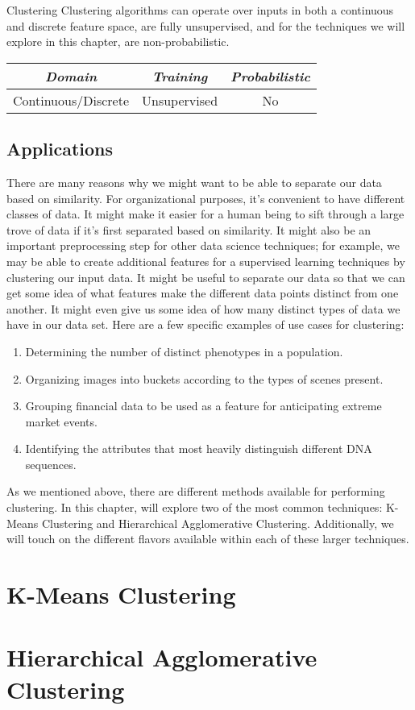 \begin{mlcube}{Clustering}
Clustering algorithms can operate over inputs in both a continuous and discrete feature space, are fully unsupervised, and for the techniques we will explore in this chapter, are non-probabilistic.
\begin{center}
    \begin{tabular}{c|c|c}
    \textit{\textbf{Domain}} & \textit{\textbf{Training}} & \textit{\textbf{Probabilistic}} \\
    \hline
    Continuous/Discrete & Unsupervised & No \\
    \end{tabular}
\end{center}
\end{mlcube}

\subsection{Applications}
There are many reasons why we might want to be able to separate our data based on similarity. For organizational purposes, it's convenient to have different classes of data. It might make it easier for a human being to sift through a large trove of data if it's first separated based on similarity. It might also be an important preprocessing step for other data science techniques; for example, we may be able to create additional features for a supervised learning techniques by clustering our input data. It might be useful to separate our data so that we can get some idea of what features make the different data points distinct from one another. It might even give us some idea of how many distinct types of data we have in our data set. Here are a few specific examples of use cases for clustering:

\begin{enumerate}
    \item Determining the number of distinct phenotypes in a population.
    \item Organizing images into buckets according to the types of scenes present.
    \item Grouping financial data to be used as a feature for anticipating extreme market events.
    \item Identifying the attributes that most heavily distinguish different DNA sequences.
\end{enumerate}

As we mentioned above, there are different methods available for performing clustering. In this chapter, will explore two of the most common techniques: K-Means Clustering and Hierarchical Agglomerative Clustering. Additionally, we will touch on the different flavors available within each of these larger techniques.

\section{K-Means Clustering}
\section{Hierarchical Agglomerative Clustering}